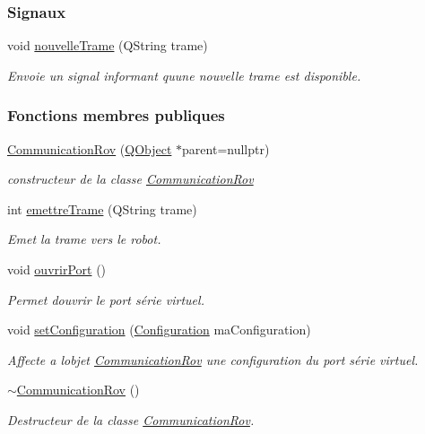 \subsubsection*{Signaux}
\begin{DoxyCompactItemize}
\item 
void \hyperlink{class_communication_rov_a78ee383e056cec7e8b24f3f9e472f60f}{nouvelle\+Trame} (Q\+String trame)
\begin{DoxyCompactList}\small\item\em Envoie un signal informant qu\textquotesingle{}une nouvelle trame est disponible. \end{DoxyCompactList}\end{DoxyCompactItemize}
\subsubsection*{Fonctions membres publiques}
\begin{DoxyCompactItemize}
\item 
\hyperlink{class_communication_rov_a22b64c69228d392a212f543e071adc02}{Communication\+Rov} (\hyperlink{class_q_object}{Q\+Object} $\ast$parent=nullptr)
\begin{DoxyCompactList}\small\item\em constructeur de la classe \hyperlink{class_communication_rov}{Communication\+Rov} \end{DoxyCompactList}\item 
int \hyperlink{class_communication_rov_a4f52076db8d6e78abe1745fa1e235272}{emettre\+Trame} (Q\+String trame)
\begin{DoxyCompactList}\small\item\em Emet la trame vers le robot. \end{DoxyCompactList}\item 
void \hyperlink{class_communication_rov_acc835a6d927b1b8cd631e64ffabca0b4}{ouvrir\+Port} ()
\begin{DoxyCompactList}\small\item\em Permet d\textquotesingle{}ouvrir le port série virtuel. \end{DoxyCompactList}\item 
void \hyperlink{class_communication_rov_a3d83702b8b9a753761d924556e55c38d}{set\+Configuration} (\hyperlink{struct_configuration}{Configuration} ma\+Configuration)
\begin{DoxyCompactList}\small\item\em Affecte a l\textquotesingle{}objet \hyperlink{class_communication_rov}{Communication\+Rov} une configuration du port série virtuel. \end{DoxyCompactList}\item 
\hyperlink{class_communication_rov_a97e96f47dad6d47cbec4adc82756b49e}{$\sim$\+Communication\+Rov} ()
\begin{DoxyCompactList}\small\item\em Destructeur de la classe \hyperlink{class_communication_rov}{Communication\+Rov}. \end{DoxyCompactList}\end{DoxyCompactItemize}
